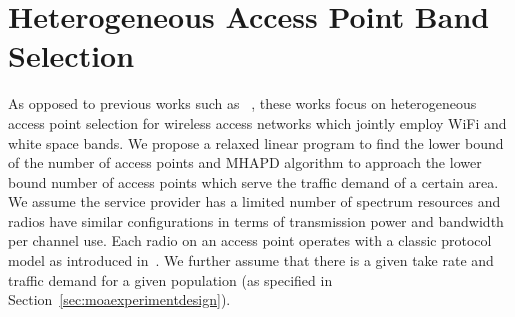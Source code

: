 



\section{Heterogeneous Access Point Band Selection}
\label{subsec:moaproblem}

As opposed to previous works such as
~\cite{franklin2007node,robinson2010deploying,si2010overview}, 
these works focus on heterogeneous access point selection 
for wireless access networks which jointly employ WiFi and white space bands.
We propose a relaxed linear program to find the lower bound of the number of access points
and MHAPD algorithm  to approach the lower bound number of access points which serve
the traffic demand of a certain area. We assume the service provider has a limited number 
of spectrum resources and radios have similar configurations in terms of transmission power and bandwidth per 
channel use. Each radio on an access 
point operates with a classic protocol model as introduced in~\cite{gupta2000capacity}. 
We further assume that there is a given take rate and traffic demand for a given 
population (as specified in Section~\ref{sec:moaexperimentdesign}).

